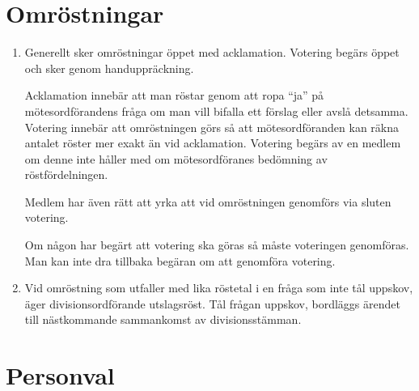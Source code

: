 \documentclass{dvd}
\begin{document}
	\section{Omröstningar}

	\begin{enumerate}[label=\arabic* §, ref=\arabic*]
		\item Generellt sker omröstningar öppet med acklamation.
		Votering begärs öppet och sker genom handuppräckning.

		Acklamation innebär att man röstar genom att ropa ``ja'' på mötesordförandens fråga om man vill bifalla ett förslag eller avslå detsamma.
		Votering innebär att omröstningen görs så att mötesordföranden kan räkna antalet röster mer exakt än vid acklamation.
		Votering begärs av en medlem om denne inte håller med om mötesordföranes bedömning av röstfördelningen.

		Medlem har även rätt att yrka att vid omröstningen genomförs via sluten votering.

		Om någon har begärt att votering ska göras så måste voteringen genomföras.
		Man kan inte dra tillbaka begäran om att genomföra votering.

		\item Vid omröstning som utfaller med lika röstetal i en fråga som inte tål uppskov, äger divisionsordförande utslagsröst.
		Tål frågan uppskov, bordläggs ärendet till nästkommande sammankomst av divisionsstämman.
	\end{enumerate}

	\section{Personval}
\end{document}
